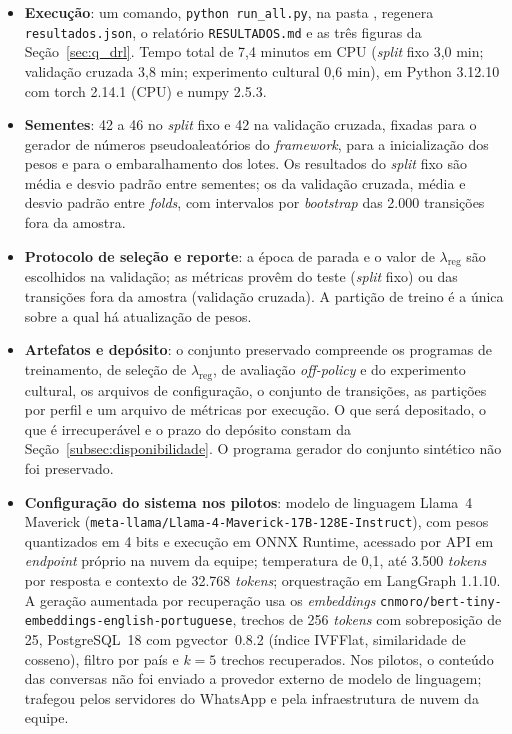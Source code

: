 \begin{itemize}
    \item \textbf{Execução}: um comando, \texttt{python run\_all.py}, na pasta , regenera \texttt{resultados.json}, o relatório \texttt{RESULTADOS.md} e as três figuras da Seção~\ref{sec:q_drl}. Tempo total de 7,4 minutos em CPU (\emph{split} fixo 3,0 min; validação cruzada 3,8 min; experimento cultural 0,6 min), em Python 3.12.10 com torch 2.14.1 (CPU) e numpy 2.5.3.
    \item \textbf{Sementes}: 42 a 46 no \emph{split} fixo e 42 na validação cruzada, fixadas para o gerador de números pseudoaleatórios do \textit{framework}, para a inicialização dos pesos e para o embaralhamento dos lotes. Os resultados do \emph{split} fixo são média e desvio padrão entre sementes; os da validação cruzada, média e desvio padrão entre \emph{folds}, com intervalos por \emph{bootstrap} das 2.000 transições fora da amostra.
    \item \textbf{Protocolo de seleção e reporte}: a época de parada e o valor de $\lambda_{\text{reg}}$ são escolhidos na validação; as métricas provêm do teste (\emph{split} fixo) ou das transições fora da amostra (validação cruzada). A partição de treino é a única sobre a qual há atualização de pesos.
    \item \textbf{Artefatos e depósito}: o conjunto preservado compreende os programas de treinamento, de seleção de $\lambda_{\text{reg}}$, de avaliação \textit{off-policy} e do experimento cultural, os arquivos de configuração, o conjunto de transições, as partições por perfil e um arquivo de métricas por execução. O que será depositado, o que é irrecuperável e o prazo do depósito constam da Seção~\ref{subsec:disponibilidade}. O programa gerador do conjunto sintético não foi preservado.
    \item \textbf{Configuração do sistema nos pilotos}: modelo de linguagem Llama~4 Maverick (\texttt{meta-llama/Llama-4-Maverick-17B-128E-Instruct}), com pesos quantizados em 4 bits e execução em ONNX Runtime, acessado por API em \textit{endpoint} próprio na nuvem da equipe; temperatura de 0,1, até 3.500 \textit{tokens} por resposta e contexto de 32.768 \textit{tokens}; orquestração em LangGraph 1.1.10. A geração aumentada por recuperação usa os \textit{embeddings} \texttt{cnmoro/bert-tiny-embeddings-english-portuguese}, trechos de 256 \textit{tokens} com sobreposição de 25, PostgreSQL~18 com pgvector~0.8.2 (índice IVFFlat, similaridade de cosseno), filtro por país e $k = 5$ trechos recuperados. Nos pilotos, o conteúdo das conversas não foi enviado a provedor externo de modelo de linguagem; trafegou pelos servidores do WhatsApp e pela infraestrutura de nuvem da equipe.
\end{itemize}

